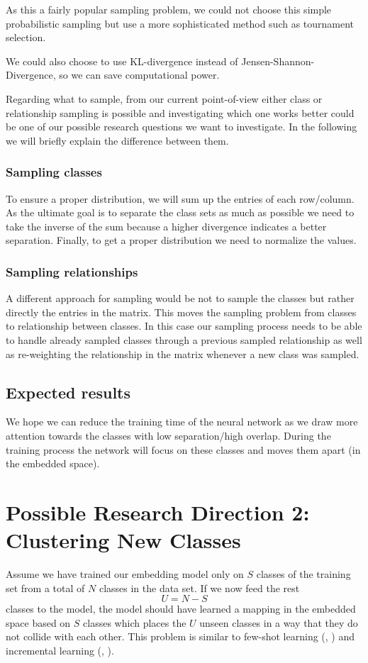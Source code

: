 As this a fairly popular sampling problem, we could not choose this simple probabilistic sampling but use a more sophisticated method such as tournament selection.

We could also choose to use KL-divergence instead of Jensen-Shannon-Divergence, so we can save computational power.

Regarding what to sample, from our current point-of-view either class or relationship sampling is possible and investigating which one works better could be one of our possible research questions we want to investigate. In the following we will briefly explain the difference between them.

\subsubsection{Sampling classes}
To ensure a proper distribution, we will sum up the entries of each row/column. As the ultimate goal is to separate the class sets as much as possible we need to take the inverse of the sum because a higher divergence indicates a better separation. Finally, to get a proper distribution we need to normalize the values.

\subsubsection{Sampling relationships}
A different approach for sampling would be not to sample the classes but rather directly the entries in the matrix. This moves the sampling problem from classes to relationship between classes. In this case our sampling process needs to be able to handle already sampled classes through a previous sampled relationship as well as re-weighting the relationship in the matrix whenever a new class was sampled. 

\subsection{Expected results}
We hope we can reduce the training time of the neural network as we draw more attention towards the classes with low separation/high overlap. During the training process the network will focus on these classes and moves them apart (in the embedded space).

\section{Possible Research Direction 2: Clustering New Classes}
Assume we have trained our embedding model only on $S$ classes of the training set from a total of $N$ classes in the data set. If we now feed the rest 
\begin{equation*}
	U = N - S
\end{equation*} 
classes to the model, the model should have learned a mapping in the embedded space based on $S$ classes which places the $U$ unseen classes in a way that they do not collide with each other. This problem is similar to few-shot learning (\cite{edwards2016towards}, \cite{snell2017prototypical}) and incremental learning (\cite{lee2018simple}, \cite{yang2018robust}). 


